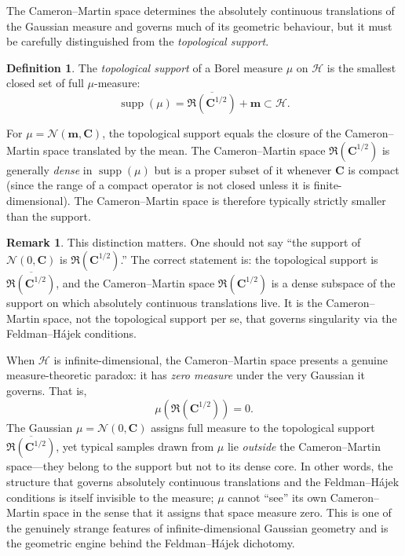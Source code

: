 \documentclass[12pt, oneside]{book}
\theoremstyle{plain}
\theoremstyle{definition}
\newtheorem{definition}[theorem]{Definition}
\newtheorem{remark}[theorem]{Remark}
\newcommand{\calH}{\mathcal{H}}
\newcommand{\calN}{\mathcal{N}}
\newcommand{\ran}{\mathfrak{R}}
\DeclareMathOperator{\supp}{supp}
\begin{document}
The Cameron--Martin space determines the absolutely continuous translations of the Gaussian measure and governs much of its geometric behaviour, but it must be carefully distinguished from the \emph{topological support}.

\begin{definition}
The \emph{topological support} of a Borel measure $\mu$ on $\calH$ is the smallest closed set of full $\mu$-measure:
\begin{equation}
\supp(\mu) = \overline{\ran(\mathbf{C}^{1/2})} + \mathbf{m} \subset \calH.
\end{equation}
\end{definition}

For $\mu = \calN(\mathbf{m}, \mathbf{C})$, the topological support equals the closure of the Cameron--Martin space translated by the mean. The Cameron--Martin space $\ran(\mathbf{C}^{1/2})$ is generally \emph{dense} in $\supp(\mu)$ but is a proper subset of it whenever $\mathbf{C}$ is compact (since the range of a compact operator is not closed unless it is finite-dimensional). The Cameron--Martin space is therefore typically strictly smaller than the support.

\begin{remark}
This distinction matters. One should not say ``the support of $\calN(0, \mathbf{C})$ is $\ran(\mathbf{C}^{1/2})$.'' The correct statement is: the topological support is $\overline{\ran(\mathbf{C}^{1/2})}$, and the Cameron--Martin space $\ran(\mathbf{C}^{1/2})$ is a dense subspace of the support on which absolutely continuous translations live. It is the Cameron--Martin space, not the topological support per se, that governs singularity via the Feldman--H\'ajek conditions.

When $\calH$ is infinite-dimensional, the Cameron--Martin space presents a genuine measure-theoretic paradox: it has \emph{zero measure} under the very Gaussian it governs. That is,
\begin{equation}
\mu\!\left(\ran(\mathbf{C}^{1/2})\right) = 0.
\end{equation}
The Gaussian $\mu = \calN(0, \mathbf{C})$ assigns full measure to the topological support $\overline{\ran(\mathbf{C}^{1/2})}$, yet typical samples drawn from $\mu$ lie \emph{outside} the Cameron--Martin space---they belong to the support but not to its dense core. In other words, the structure that governs absolutely continuous translations and the Feldman--H\'ajek conditions is itself invisible to the measure; $\mu$ cannot ``see'' its own Cameron--Martin space in the sense that it assigns that space measure zero. This is one of the genuinely strange features of infinite-dimensional Gaussian geometry and is the geometric engine behind the Feldman--H\'ajek dichotomy.
\end{remark}
\end{document}
